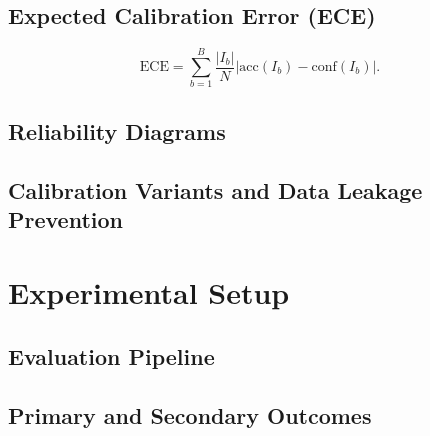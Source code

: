 \documentclass[runningheads]{llncs}
\begin{document}
\subsection{Expected Calibration Error (ECE)}
\begin{equation}
	\mathrm{ECE} =
	\sum_{b=1}^{B}\frac{|I_b|}{N}
	\left|\mathrm{acc}(I_b)-\mathrm{conf}(I_b)\right|.
	\label{eq:ece}
\end{equation}

\subsection{Reliability Diagrams}

\subsection{Calibration Variants and Data Leakage Prevention}

\section{Experimental Setup}
\subsection{Evaluation Pipeline}

\subsection{Primary and Secondary Outcomes}
\end{document}
